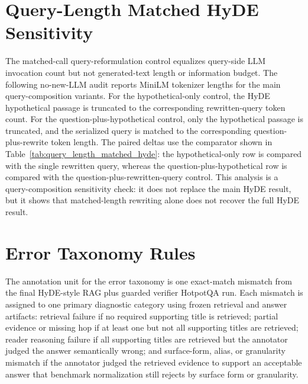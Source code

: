 \documentclass[10pt]{article}
\begin{document}



\clearpage
\section{Query-Length Matched HyDE Sensitivity}
\label{sec:supp_query_length_matched_hyde}

The matched-call query-reformulation control equalizes query-side LLM invocation count but not generated-text length or information budget. The following no-new-LLM audit reports MiniLM tokenizer lengths for the main query-composition variants. For the hypothetical-only control, the HyDE hypothetical passage is truncated to the corresponding rewritten-query token count. For the question-plus-hypothetical control, only the hypothetical passage is truncated, and the serialized query is matched to the corresponding question-plus-rewrite token length. The paired deltas use the comparator shown in Table~\ref{tab:query_length_matched_hyde}: the hypothetical-only row is compared with the single rewritten query, whereas the question-plus-hypothetical row is compared with the question-plus-rewritten-query control. This analysis is a query-composition sensitivity check: it does not replace the main HyDE result, but it shows that matched-length rewriting alone does not recover the full HyDE result.



\clearpage
\section{Error Taxonomy Rules}
\label{sec:supp_error_taxonomy_rules}

The annotation unit for the error taxonomy is one exact-match mismatch from the final HyDE-style RAG plus guarded verifier HotpotQA run. Each mismatch is assigned to one primary diagnostic category using frozen retrieval and answer artifacts: retrieval failure if no required supporting title is retrieved; partial evidence or missing hop if at least one but not all supporting titles are retrieved; reader reasoning failure if all supporting titles are retrieved but the annotator judged the answer semantically wrong; and surface-form, alias, or granularity mismatch if the annotator judged the retrieved evidence to support an acceptable answer that benchmark normalization still rejects by surface form or granularity.
\end{document}
